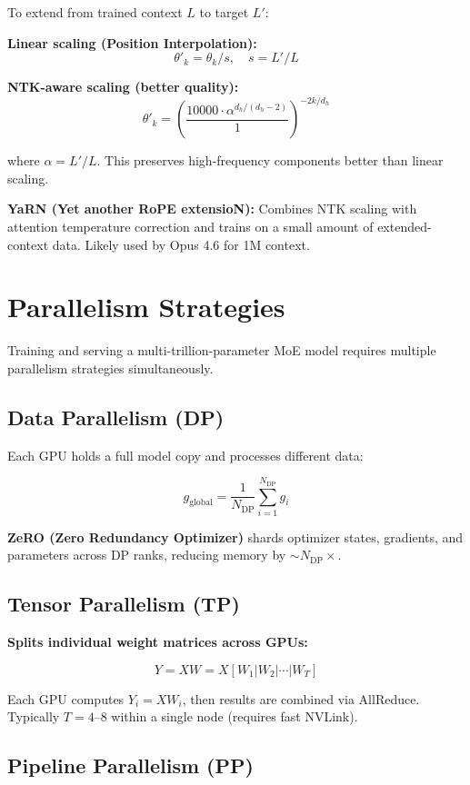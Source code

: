 \documentclass[11pt,a4paper]{article}
\begin{document}
To extend from trained context $L$ to target $L'$:

\textbf{Linear scaling (Position Interpolation):}
$$\theta'_k = \theta_k / s, \quad s = L' / L$$

\textbf{NTK-aware scaling (better quality):}
$$\theta'_k = \left(\frac{10000 \cdot \alpha^{d_h/(d_h - 2)}}{1}\right)^{-2k/d_h}$$

where $\alpha = L'/L$. This preserves high-frequency components better than linear scaling.

\textbf{YaRN (Yet another RoPE extensioN):}
Combines NTK scaling with attention temperature correction and trains on a small amount of extended-context data. Likely used by Opus 4.6 for 1M context.

\section{Parallelism Strategies}

Training and serving a multi-trillion-parameter MoE model requires multiple parallelism strategies simultaneously.

\subsection{Data Parallelism (DP)}

Each GPU holds a full model copy and processes different data:

$$g_{\text{global}} = \frac{1}{N_{\text{DP}}} \sum_{i=1}^{N_{\text{DP}}} g_i$$

\textbf{ZeRO (Zero Redundancy Optimizer)} shards optimizer states, gradients, and parameters across DP ranks, reducing memory by $\sim N_{\text{DP}}\times$.

\subsection{Tensor Parallelism (TP)}

\textbf{Splits individual weight matrices across GPUs:}

$$Y = XW = X[W_1 | W_2 | \cdots | W_T]$$

Each GPU computes $Y_i = XW_i$, then results are combined via AllReduce. Typically $T = 4\text{--}8$ within a single node (requires fast NVLink).

\subsection{Pipeline Parallelism (PP)}
\end{document}
